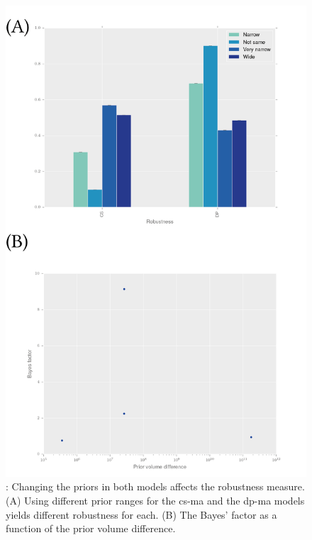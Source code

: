 \begin{figure}[h]
\begin{center}
\includegraphics[scale=0.7]{../../chapters/chapterStabilityFinder/images/priors_matter_2.png}
\caption[Changing the priors in both models affects the robustness measure.]{ \label{fig:priors_matter2}: Changing the priors in both models affects the robustness measure. (A) Using different prior ranges for the \acrshort{cs-ma} and the \acrshort{dp-ma} models yields different robustness for each. (B) The Bayes' factor as a function of the prior volume difference. }
\end{center}
\end{figure}
\clearpage

